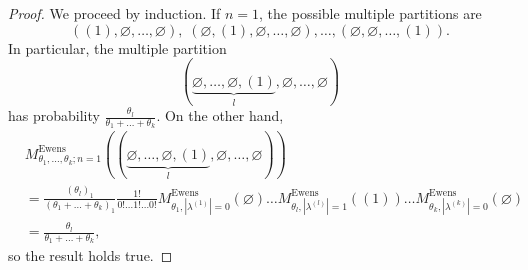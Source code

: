 \documentclass[10pt,a4paper]{amsart}
\DeclareMathOperator{\Ewens}{Ewens}
\begin{document}
\begin{proof}
We proceed by induction. If $n=1$, the possible multiple partitions are
$$
((1),\varnothing,\ldots,\varnothing),\; (\varnothing, (1),\varnothing,\ldots,\varnothing),\ldots,
(\varnothing,\varnothing,\ldots,(1)).
$$
In particular, the multiple partition
$$
\left(\underset{l}{\underbrace{\varnothing,\ldots,\varnothing, (1)}},\varnothing,\ldots,\varnothing\right)
$$
has probability $\frac{\theta_l}{\theta_1+\ldots+\theta_k}$. On the other hand,
\begin{equation}
\begin{split}
&M^{\Ewens}_{\theta_1,\ldots,\theta_k; n=1}\left(\left(\underset{l}{\underbrace{\varnothing,\ldots,\varnothing, (1)}},\varnothing,\ldots,\varnothing\right)
\right)\\
&=\frac{(\theta_l)_1}{(\theta_1+\ldots+\theta_k)_1}
\frac{1!}{0!\ldots 1!\ldots 0!}
M^{\Ewens}_{\theta_1,|\lambda^{(1)}|=0}\left(\varnothing\right)
\ldots
M^{\Ewens}_{\theta_l,|\lambda^{(l)}|=1}\left((1)\right)
\ldots
M^{\Ewens}_{\theta_k,|\lambda^{(k)}|=0}\left(\varnothing\right)\\
&=\frac{\theta_l}{\theta_1+\ldots+\theta_k},
\end{split}
\end{equation}
so the result holds true.


\end{proof}
\end{document}
